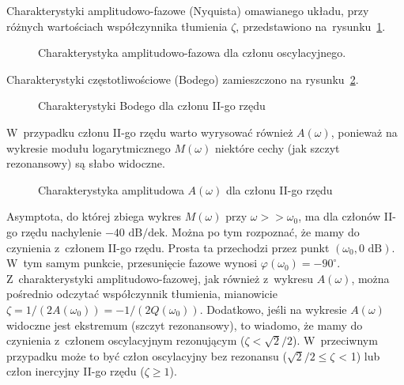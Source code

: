 \documentclass[paper=a4,DIV=12]{lpas}
\newcommand{\degree}{^{\circ}}
\begin{document}
\begin{appendices}
  Charakterystyki amplitudowo-fazowe (Nyquista) omawianego układu, przy różnych
  wartościach współczynnika tłumienia $\zeta$, przedstawiono
  na~rysunku~\ref{fig:3KG02}.
  \begin{figure}[H]
    \centering
    
    \caption{Charakterystyka amplitudowo-fazowa dla członu oscylacyjnego.}
    \label{fig:3KG02}
  \end{figure}

  Charakterystyki częstotliwościowe (Bodego) zamieszczono na rysunku~\ref{fig:O26C4}.
  \begin{figure}[H]
    \centering
    
    \caption{Charakterystyki Bodego dla członu II-go rzędu}
    \label{fig:O26C4}
  \end{figure}
  W~przypadku członu II-go rzędu warto wyrysować również $A(\omega)$, ponieważ
  na wykresie modułu logarytmicznego $M(\omega)$ niektóre cechy (jak szczyt
  rezonansowy) są słabo widoczne.
  \begin{figure}[H]
    \centering
    
    \caption{Charakterystyka amplitudowa $A(\omega)$ dla członu II-go rzędu}
    \label{eq:9LBEW}
  \end{figure}

  Asymptota, do której zbiega wykres $M(\omega)$ przy $\omega >> \omega_0$, ma
  dla członów II-go rzędu nachylenie $-40 \text{ dB/dek}$. Można po tym
  rozpoznać, że mamy do czynienia z~członem II-go rzędu. Prosta ta przechodzi
  przez punkt $(\omega_0, 0\text{ dB})$. W~tym samym punkcie, przesunięcie
  fazowe wynosi $\varphi(\omega_0) = -90\degree$. Z~charakterystyki
  amplitudowo-fazowej, jak również z~wykresu $A(\omega)$, można pośrednio
  odczytać współczynnik tłumienia, mianowicie
  $\zeta=1/(2A(\omega_0))=-1/(2Q(\omega_0))$. Dodatkowo, jeśli na wykresie
  $A(\omega)$ widoczne jest ekstremum (szczyt rezonansowy), to wiadomo, że mamy
  do czynienia z~członem oscylacyjnym rezonującym ($\zeta < \sqrt{2}/2$).
  W~przeciwnym przypadku może to być człon oscylacyjny bez rezonansu
  ($\sqrt{2}/2 \le \zeta$ < 1) lub człon inercyjny II-go rzędu ($\zeta \ge 1$).


\end{appendices}
\end{document}
